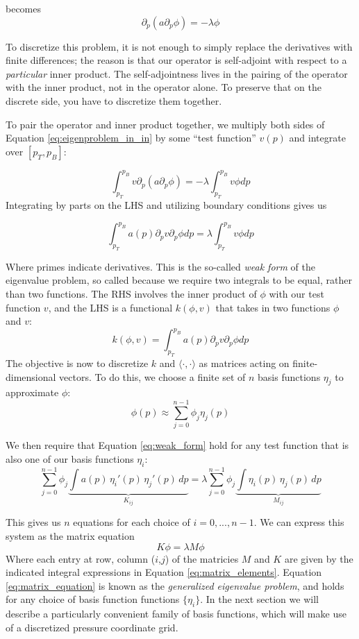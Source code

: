 \documentclass{article}
\numberwithin{equation}{section}
\begin{document}
becomes
\begin{equation}
\label{eq:eigenproblem_in_in}
\partial_p(a\partial_p\phi) = -\lambda\phi
\end{equation}

To discretize this problem, it is not enough to simply replace the derivatives with finite differences; the reason is that our operator is self-adjoint with respect to a \textit{particular} inner product. The self-adjointness lives in the pairing of the operator with the inner product, not in the operator alone. To preserve that on the discrete side, you have to discretize them together.

\par To pair the operator and inner product together, we multiply both sides of Equation \ref{eq:eigenproblem_in_in} by some ``test function'' $v(p)$ and integrate over $[p_T, p_B]$:

$$
\int_{p_T}^{p_B}v\partial_p(a\partial_p\phi) = -\lambda\int_{p_T}^{p_B}v\phi dp
$$
Integrating by parts on the LHS and utilizing boundary conditions gives us

\begin{equation}
  \label{eq:weak_form}
  \int_{p_T}^{p_B}a(p)\partial_pv\partial_p\phi dp = \lambda\int_{p_T}^{p_B}v\phi dp
\end{equation}

Where primes indicate derivatives. This is the so-called \textit{weak form} of the eigenvalue problem, so called because we require two integrals to be equal, rather than two functions. The RHS involves the inner product of $\phi$ with our test function $v$, and the LHS is a functional $k(\phi, v)$ that takes in two functions $\phi$ and $v$:
$$
k(\phi, v) = \int_{p_T}^{p_B}a(p)\partial_pv\partial_p\phi dp
$$
The objective is now to discretize $k$ and $\langle\cdot,\cdot\rangle$ as matrices acting on finite-dimensional vectors. To do this, we choose a finite set of $n$ basis functions $\eta_j$ to approximate $\phi$:
$$
\phi(p) \approx \sum_{j=0}^{n-1}\phi_j\eta_j(p)
$$

We then require that Equation \ref{eq:weak_form} hold for any test function that is also one of our basis functions $\eta_i$:
\begin{equation}
  \label{eq:matrix_elements}
  \sum_{j=0}^{n-1} \phi_j \underbrace{\int a(p)\, \eta_i'(p)\, \eta_j'(p)\, dp}_{K_{ij}} = \lambda   \sum_{j=0}^{n-1}\phi_j \underbrace{\int \eta_i(p)\, \eta_j(p)\, dp}_{M_{ij}}
\end{equation}

This gives us $n$ equations for each choice of $i=0,...,n-1$. We can express this system as the matrix equation 
\begin{equation}
  \label{eq:matrix_equation}
  K\phi = \lambda M\phi
\end{equation}
Where each entry at row, column ($i$,$j$) of the matricies $M$ and $K$ are given by the indicated integral expressions in Equation \ref{eq:matrix_elements}. Equation \ref{eq:matrix_equation} is known as the \textit{generalized eigenvalue problem}, and holds for any choice of basis function functions $\{\eta_i\}$. In the next section we will describe a particularly convenient family of basis functions, which will make use of a discretized pressure coordinate grid. 
\end{document}
